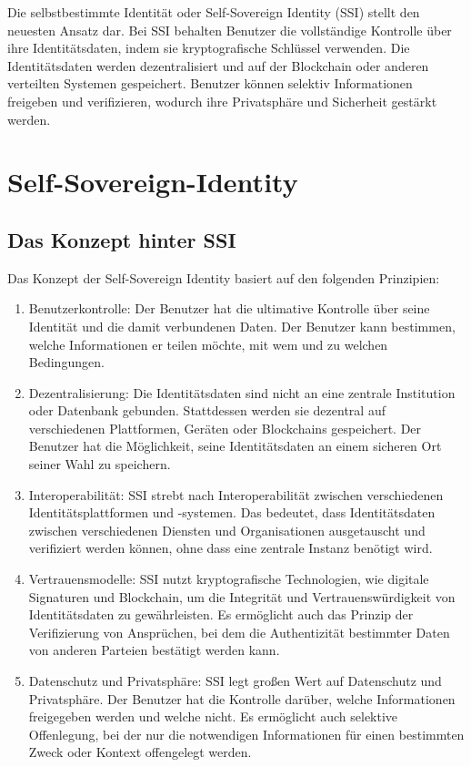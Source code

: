 Die selbstbestimmte Identität oder Self-Sovereign Identity (SSI) stellt den neuesten Ansatz dar. Bei SSI behalten Benutzer die vollständige Kontrolle über ihre Identitätsdaten, indem sie kryptografische Schlüssel verwenden. Die Identitätsdaten werden dezentralisiert und auf der Blockchain oder anderen verteilten Systemen gespeichert. Benutzer können selektiv Informationen freigeben und verifizieren, wodurch ihre Privatsphäre und Sicherheit gestärkt werden.

\section{Self-Sovereign-Identity}

\subsection{Das Konzept hinter SSI}	
	Das Konzept der Self-Sovereign Identity \cite{SOV1} basiert auf den folgenden Prinzipien:
	
	\begin{enumerate}
		\item Benutzerkontrolle: Der Benutzer hat die ultimative Kontrolle über seine Identität und die damit verbundenen Daten. Der Benutzer kann bestimmen, welche Informationen er teilen möchte, mit wem und zu welchen Bedingungen.
		
		\item Dezentralisierung: Die Identitätsdaten sind nicht an eine zentrale Institution oder Datenbank gebunden. Stattdessen werden sie dezentral auf verschiedenen Plattformen, Geräten oder Blockchains gespeichert. Der Benutzer hat die Möglichkeit, seine Identitätsdaten an einem sicheren Ort seiner Wahl zu speichern.
		
		\item Interoperabilität: SSI strebt nach Interoperabilität zwischen verschiedenen Identitätsplattformen und -systemen. Das bedeutet, dass Identitätsdaten zwischen verschiedenen Diensten und Organisationen ausgetauscht und verifiziert werden können, ohne dass eine zentrale Instanz benötigt wird.
		
		\item Vertrauensmodelle: SSI nutzt kryptografische Technologien, wie digitale Signaturen und Blockchain, um die Integrität und Vertrauenswürdigkeit von Identitätsdaten zu gewährleisten. Es ermöglicht auch das Prinzip der Verifizierung von Ansprüchen, bei dem die Authentizität bestimmter Daten von anderen Parteien bestätigt werden kann.
		
		\item Datenschutz und Privatsphäre: SSI legt großen Wert auf Datenschutz und Privatsphäre. Der Benutzer hat die Kontrolle darüber, welche Informationen freigegeben werden und welche nicht. Es ermöglicht auch selektive Offenlegung, bei der nur die notwendigen Informationen für einen bestimmten Zweck oder Kontext offengelegt werden.
	\end{enumerate}
	
